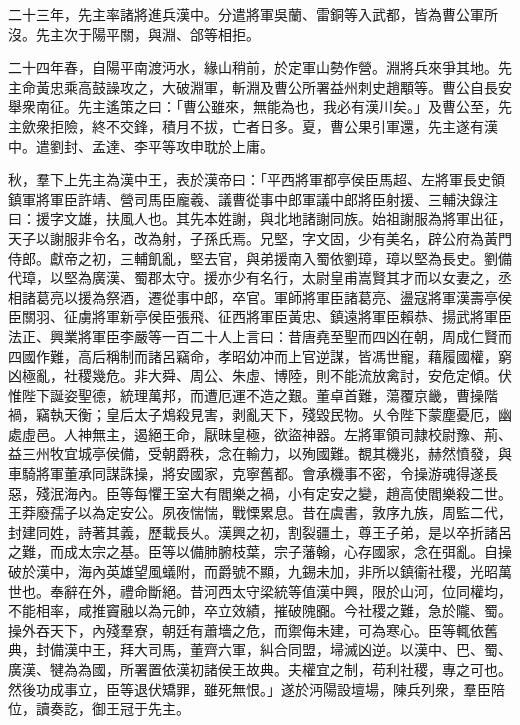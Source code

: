 \begin{pinyinscope}
二十三年，先主率諸將進兵漢中。分遣將軍吳蘭、雷銅等入武都，皆為曹公軍所沒。先主次于陽平關，與淵、郃等相拒。

二十四年春，自陽平南渡沔水，緣山稍前，於定軍山勢作營。淵將兵來爭其地。先主命黃忠乘高鼓譟攻之，大破淵軍，斬淵及曹公所署益州刺史趙顒等。曹公自長安舉衆南征。先主遙策之曰：「曹公雖來，無能為也，我必有漢川矣。」及曹公至，先主歛衆拒險，終不交鋒，積月不拔，亡者日多。夏，曹公果引軍還，先主遂有漢中。遣劉封、孟達、李平等攻申耽於上庸。

秋，羣下上先主為漢中王，表於漢帝曰：「平西將軍都亭侯臣馬超、左將軍長史領鎮軍將軍臣許靖、營司馬臣龐羲、議曹從事中郎軍議中郎將臣射援、三輔決錄注曰：援字文雄，扶風人也。其先本姓謝，與北地諸謝同族。始祖謝服為將軍出征，天子以謝服非令名，改為射，子孫氏焉。兄堅，字文固，少有美名，辟公府為黃門侍郎。獻帝之初，三輔飢亂，堅去官，與弟援南入蜀依劉璋，璋以堅為長史。劉備代璋，以堅為廣漢、蜀郡太守。援亦少有名行，太尉皇甫嵩賢其才而以女妻之，丞相諸葛亮以援為祭酒，遷從事中郎，卒官。軍師將軍臣諸葛亮、盪寇將軍漢壽亭侯臣關羽、征虜將軍新亭侯臣張飛、征西將軍臣黃忠、鎮遠將軍臣賴恭、揚武將軍臣法正、興業將軍臣李嚴等一百二十人上言曰：昔唐堯至聖而四凶在朝，周成仁賢而四國作難，高后稱制而諸呂竊命，孝昭幼冲而上官逆謀，皆馮世寵，藉履國權，窮凶極亂，社稷幾危。非大舜、周公、朱虛、博陸，則不能流放禽討，安危定傾。伏惟陛下誕姿聖德，統理萬邦，而遭厄運不造之艱。董卓首難，蕩覆京畿，曹操階禍，竊執天衡；皇后太子鴆殺見害，剥亂天下，殘毀民物。乆令陛下蒙塵憂厄，幽處虛邑。人神無主，遏絕王命，厭昧皇極，欲盜神器。左將軍領司隷校尉豫、荊、益三州牧宜城亭侯備，受朝爵秩，念在輸力，以殉國難。覩其機兆，赫然憤發，與車騎將軍董承同謀誅操，將安國家，克寧舊都。會承機事不密，令操游魂得遂長惡，殘泯海內。臣等每懼王室大有閻樂之禍，小有定安之變，趙高使閻樂殺二世。王莽廢孺子以為定安公。夙夜惴惴，戰慄累息。昔在虞書，敦序九族，周監二代，封建同姓，詩著其義，歷載長乆。漢興之初，割裂疆土，尊王子弟，是以卒折諸呂之難，而成太宗之基。臣等以備肺腑枝葉，宗子藩翰，心存國家，念在弭亂。自操破於漢中，海內英雄望風蟻附，而爵號不顯，九錫未加，非所以鎮衞社稷，光昭萬世也。奉辭在外，禮命斷絕。昔河西太守梁統等值漢中興，限於山河，位同權均，不能相率，咸推竇融以為元帥，卒立效績，摧破隗嚻。今社稷之難，急於隴、蜀。操外吞天下，內殘羣寮，朝廷有蕭墻之危，而禦侮未建，可為寒心。臣等輒依舊典，封備漢中王，拜大司馬，董齊六軍，糾合同盟，埽滅凶逆。以漢中、巴、蜀、廣漢、犍為為國，所署置依漢初諸侯王故典。夫權宜之制，苟利社稷，專之可也。然後功成事立，臣等退伏矯罪，雖死無恨。」遂於沔陽設壇場，陳兵列衆，羣臣陪位，讀奏訖，御王冠于先主。


\end{pinyinscope}
